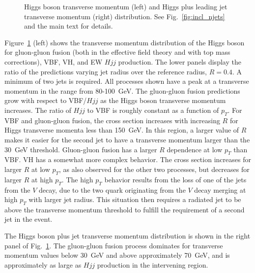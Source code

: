 \documentclass[10pt,prd,fleqn,superscriptaddress,notitlepage,nofootinbib,preprintnumbers,nobalancelastpage]{revtex4-1}
\newcommand{\VBF}{VBF\xspace}
\newcommand{\VH}{VH\xspace}
\begin{document}
\begin{figure}[p]
\begin{minipage}{.295\textwidth}
  \end{minipage}
\caption{Higgs boson transverse momentum (left) and Higgs plus leading jet transverse momentum (right) distribution.
See Fig.~\ref{fig:incl_njets} and the main text for details.}
\label{fig:incl_pth}
\end{figure}


Figure~\ref{fig:incl_pth} (left) shows the transverse momentum distribution of the Higgs boson for gluon-gluon fusion (both in the effective field theory and with top mass corrections), \VBF, \VH, and EW $Hjj$ production. The lower panels display the ratio of the predictions varying jet radius over the reference radius, $R=0.4$. A minimum of two jets is required. All processes shown have a peak at a transverse momentum in the range from 80-100~GeV. The gluon-gluon fusion predictions  grow with respect to \VBF/$Hjj$ as the Higgs boson transverse momentum increases. The ratio of $Hjj$ to \VBF is roughly constant as a function of $p_T$. For \VBF and gluon-gluon fusion, the cross section increases with increasing $R$ for Higgs transverse momenta less than 150~GeV. In this region, a larger value of $R$ makes it easier for the second jet to have a transverse momentum larger than the 30~GeV threshold. Gluon-gluon fusion has a larger $R$ dependence at low $p_T$ than \VBF.
\VH has a somewhat more complex behavior. The cross section increases for larger $R$ at low $p_T$, as also observed for the other two processes, but decreases for larger $R$ at high $p_T$. The high $p_T$ behavior  results from the loss of one of the jets from the $V$ decay,
due to the two quark originating from the $V$ decay merging at high $p_T$ with larger jet radius. This situation then requires a radiated jet to be above the transverse momentum threshold to fulfill the requirement of a second jet in the event.

The Higgs boson plus jet transverse momentum distribution is shown in the right panel of Fig.~\ref{fig:incl_pth}.
The gluon-gluon fusion process dominates for transverse momentum values below 30~GeV and above approximately 70~GeV,
and is approximately as large as $Hjj$ production in the intervening region.
\end{document}
